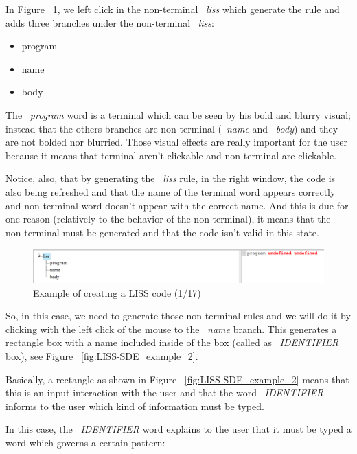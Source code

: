 \documentclass[
  oneside,
  11pt, a4paper,
  footinclude=true,
  headinclude=true,
  cleardoublepage=empty
]{scrbook}
\begin{document}
In Figure ~\ref{fig:LISS-SDE_example_1}, we left click in the non-terminal ~\textit{liss} which generate the rule and adds three branches under the non-terminal ~\textit{liss}:

\begin{itemize}
\item program
\item name
\item body
\end{itemize}

The ~\textit{program} word is a terminal which can be seen by his bold and blurry visual; instead that the others branches are non-terminal (~\textit{name} and ~\textit{body}) and they are not bolded nor blurried. Those visual effects are really important for the user because it means that terminal aren't clickable and non-terminal are clickable.

Notice, also, that by generating the ~\textit{liss} rule, in the right window, the code is also being refreshed and that the name of the terminal word appears correctly and non-terminal word doesn't appear with the correct name. And this is due for one reason (relatively to the behavior of the non-terminal), it means that the non-terminal must be generated and that the code isn't valid in this state.


\begin{figure}[h!]
  \centering
    \includegraphics[width=1\textwidth]{img/LISS-SDE_creating_program/LISS-SDE1.png}
    \caption{Example of creating a LISS code (1/17)}
    \label{fig:LISS-SDE_example_1}
\end{figure}

So, in this case, we need to generate those non-terminal rules and we will do it by clicking with the left click of the mouse to the ~\textit{name} branch.
This generates a rectangle box with a name included inside of the box (called as ~\textit{IDENTIFIER} box), see Figure ~\ref{fig:LISS-SDE_example_2}.

Basically, a rectangle as shown in Figure ~\ref{fig:LISS-SDE_example_2} means that this is an input interaction with the user and that the word ~\textit{IDENTIFIER} informs to the user which kind of information must be typed.

In this case, the ~\textit{IDENTIFIER} word explains to the user that it must be typed a word which governs a certain pattern:
\end{document}
